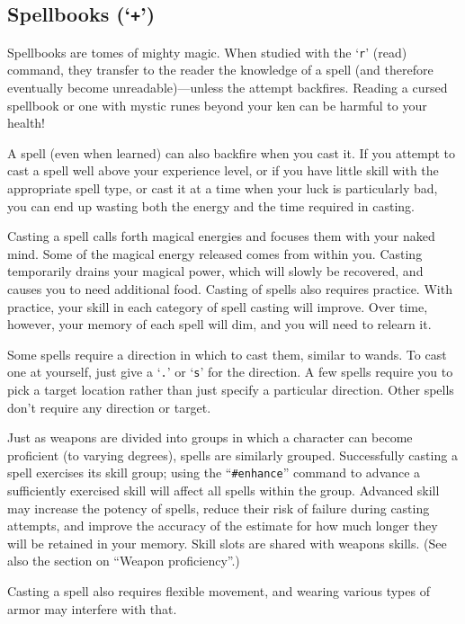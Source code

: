 \subsection*{Spellbooks (`{\tt +}')}

Spellbooks are tomes of mighty magic.  When studied with the `{\tt r}' (read)
command, they transfer to the reader the knowledge of a spell (and
therefore eventually become
unreadable)---unless the attempt backfires.
Reading a cursed spellbook or one with mystic runes beyond
your ken can be harmful to your health!

A spell (even when learned) can also backfire when you cast it.  If you
attempt to cast a spell well above your experience level, or if you have
little skill with the appropriate spell type, or cast it at
a time when your luck is particularly bad, you can end up wasting both the
energy and the time required in casting.

Casting a spell calls forth magical energies and focuses them with
your naked mind.  Some of the magical energy released comes from within
you.
Casting temporarily drains your magical power, which will slowly be
recovered, and causes you to need additional food.
Casting of spells also requires practice.  With practice, your
skill in each category of spell casting will improve.  Over time, however,
your memory of each spell will dim, and you will need to relearn it.

Some spells require a direction in which to cast them, similar to wands.
To cast one at yourself, just give a `{\tt .}' or `{\tt s}' for the direction.
A few spells require you to pick a target location rather than just specify
a particular direction.
Other spells don't require any direction or target.

Just as weapons are divided into groups in which a character can become
proficient (to varying degrees), spells are similarly grouped.
Successfully casting a spell exercises its skill group; using the
``{\tt \#enhance}'' command to advance a sufficiently exercised skill
will affect all spells within the group.  Advanced skill may increase the
potency of spells, reduce their risk of failure during casting attempts,
and improve the accuracy of the estimate for how much longer they will
be retained in your memory.
Skill slots are shared with weapons skills.  (See also the section on
``Weapon proficiency''.)

Casting a spell also requires flexible movement, and wearing various types
of armor may interfere with that.


